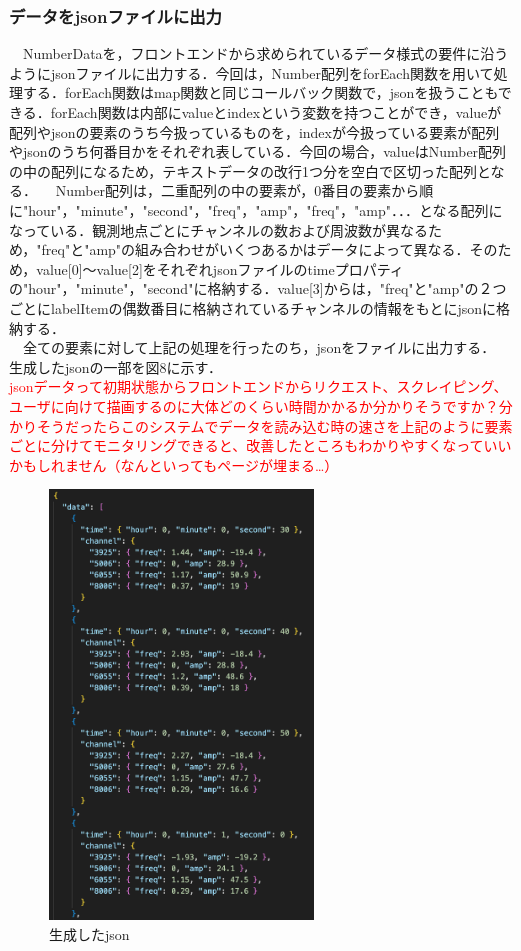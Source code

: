  \subsubsection{データをjsonファイルに出力}
　NumberDataを，フロントエンドから求められているデータ様式の要件に沿うようにjsonファイルに出力する．今回は，Number配列をforEach関数を用いて処理する．forEach関数はmap関数と同じコールバック関数で，jsonを扱うこともできる．forEach関数は内部にvalueとindexという変数を持つことができ，valueが配列やjsonの要素のうち今扱っているものを，indexが今扱っている要素が配列やjsonのうち何番目かをそれぞれ表している．今回の場合，valueはNumber配列の中の配列になるため，テキストデータの改行1つ分を空白で区切った配列となる．
　Number配列は，二重配列の中の要素が，0番目の要素から順に"hour"，"minute"，"second"，"freq"，"amp"，"freq"，"amp"．．．となる配列になっている．観測地点ごとにチャンネルの数および周波数が異なるため，"freq"と"amp"の組み合わせがいくつあるかはデータによって異なる．そのため，value[0]〜value[2]をそれぞれjsonファイルのtimeプロパティの"hour"，"minute"，"second"に格納する．value[3]からは，"freq"と"amp"の２つごとにlabelItemの偶数番目に格納されているチャンネルの情報をもとにjsonに格納する．\\
　全ての要素に対して上記の処理を行ったのち，jsonをファイルに出力する．\\
生成したjsonの一部を図8に示す．\\
\textcolor{red}{jsonデータって初期状態からフロントエンドからリクエスト、スクレイピング、ユーザに向けて描画するのに大体どのくらい時間かかるか分かりそうですか？分かりそうだったらこのシステムでデータを読み込む時の速さを上記のように要素ごとに分けてモニタリングできると、改善したところもわかりやすくなっていいかもしれません（なんといってもページが埋まる…）}
\begin{figure}[ht]
  \centering
  \includegraphics[width=70mm]{fig/jsonData.png}
  \caption{生成したjson}
\end{figure}

